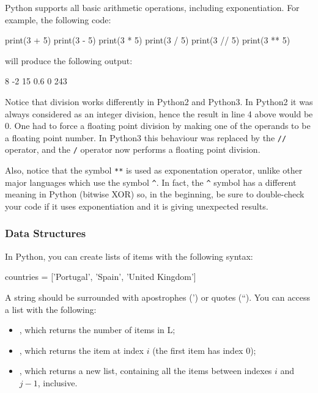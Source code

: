 Python supports all basic arithmetic operations, including exponentiation. For
example, the following code: \begin{python}
print(3 + 5)
print(3 - 5)
print(3 * 5)
print(3 / 5)
print(3 // 5)
print(3 ** 5)
\end{python}

\noindent will produce the following output:
\begin{python}
8
-2
15
0.6
0
243
\end{python}

Notice that division works differently in Python2 and Python3.
    In Python2 it was always considered as an integer division, hence the result in line 4 above would be 0.
    One had to force a floating point division by making one of the operands to be a floating point number.
    In Python3 this behaviour was replaced by the \texttt{//} operator, and the \texttt{/} operator now performs a floating point division.

Also, notice that the symbol \texttt{**} is used as exponentation operator, unlike other major languages which use the symbol \texttt{\^}. In fact, the \texttt{\^} symbol has a different meaning in Python (bitwise XOR) so, in the beginning, be sure to double-check your code if it uses exponentiation and it is giving unexpected results.

\subsubsection{Data Structures}

In Python, you can create lists of items with the following syntax:

\begin{python}
countries = ['Portugal', 'Spain', 'United Kingdom']
\end{python}

A string should be surrounded with apostrophes (') or quotes (``). You can access a list with
the following:

\begin{itemize}
 \item {}, which returns the number of items in L;
 \item {}, which returns the item at index $i$ (the first item has index 0);
 \item {}, which returns a new list, containing all the items between indexes $i$ and $j-1$, inclusive. 
\end{itemize}

